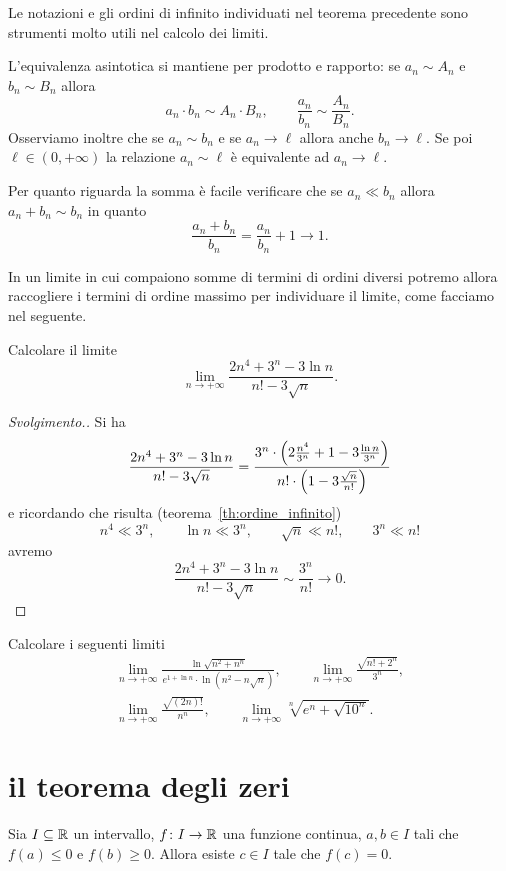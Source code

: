 Le notazioni e gli
ordini di infinito individuati nel teorema precedente
sono strumenti molto utili nel calcolo dei limiti.

L'equivalenza asintotica
si mantiene per prodotto e rapporto:
se $a_n\sim A_n$ e $b_n\sim B_n$ allora
\[
 a_n \cdot b_n \sim A_n \cdot B_n,
 \qquad
 \frac{a_n}{b_n} \sim \frac{A_n}{B_n}.
\]
Osserviamo inoltre che se
$a_n \sim b_n$ e se $a_n\to \ell$ allora
anche $b_n\to \ell$.
Se poi $\ell\in(0,+\infty)$
la relazione $a_n\sim \ell$ è equivalente ad $a_n\to \ell$.

Per quanto riguarda la somma
è facile verificare che se $a_n\ll b_n$ allora
$a_n+b_n \sim b_n$ in quanto
\[
  \frac{a_n + b_n}{b_n} = \frac{a_n}{b_n} + 1 \to 1.
\]

In un limite in cui compaiono somme di termini
di ordini diversi potremo allora raccogliere i termini di ordine
massimo per individuare il limite, come facciamo
nel seguente.

\begin{example}
Calcolare il limite
\[
\lim_{n\to+\infty}
\frac{2n^4 + 3^n - 3 \ln n}{n! - 3\sqrt n}.
\]
\end{example}
\begin{proof}[Svolgimento.]
Si ha
\[
\frac{2n^4 + 3^n - 3 \ln n}{n! - 3\sqrt{n}}
= \frac
{3^n \cdot {\left( 2\frac{n^4}{3^n}+ 1 - 3\frac{\ln n}{3^n} \right)}}
{n!\cdot {\left( 1-3\frac{\sqrt n}{n!} \right)}}
\]
e ricordando che risulta (teorema~\ref{th:ordine_infinito})
\[
n^4 \ll 3^n, \qquad
\ln n \ll 3^n, \qquad
\sqrt n \ll n!, \qquad
3^n \ll n!
\]
avremo
\[
\frac{2n^4 + 3^n - 3 \ln n}{n! - 3\sqrt{n}}
\sim \frac{3^n}{n!} \to 0.
\]
\end{proof}


\begin{exercise}
Calcolare i seguenti limiti
\begin{gather*}
  \lim_{n\to +\infty} \frac{\displaystyle \ln\sqrt{n^2+n^n}}
  {\displaystyle e^{1 + \ln n}\cdot \ln(n^2-n\sqrt n)}, \qquad
  \lim_{n\to +\infty} \frac{\sqrt{n! + 2^n}}{3^n}, \\
  \lim_{n\to +\infty} \frac{\sqrt{(2n)!}}{n^n}, \qquad
  \lim_{n\to +\infty} \sqrt[n]{e^n + \sqrt{10^n}}.
\end{gather*}
\end{exercise}

\section{il teorema degli zeri}

\begin{theorem}
\mymark{***}%
%
%
\label{th:zeri}%
Sia $I\subseteq \mathbb R$ un intervallo, $f\colon I \to \mathbb R$ una funzione
continua, $a,b\in I$ tali che $f(a)\le 0$ e $f(b)\ge 0$.
Allora esiste $c\in I$ tale che $f(c)=0$.
\end{theorem}

